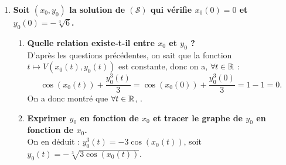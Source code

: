 \documentclass[a4paper, 11pt,reqno]{article}
\begin{document}
\begin{correction}
\begin{enumerate}
\begin{enumerate}
Cette fonction est de classe $\mathcal{C}^1$ sur $\R^2$ comme somme de fonctions $\mathcal{C}^1$. De plus, on a :
$$y^2 \frac{\partial V}{\partial x} (x,y) + \sin(x) \frac{\partial V}{\partial y} (x,y) = -y^2 \sin (x) + \sin(x) y^2 = 0.$$
La fonction v\?erifie bien la condition pr\'ec\'edente. 
\end{enumerate}
\item \textbf{Soit $(x_0,y_0)$ la solution de  $(\mathcal{S})$ qui v\'erifie $x_0(0) = 0$ et $y_0(0) = -\sqrt[3]{6}$.}
\begin{enumerate}
\item \textbf{Quelle relation existe-t-il entre $x_0$ et $y_0$ ?}\\
D'apr\`es les questions pr\'ec\'edentes, on sait que la fonction $t\mapsto V(x_0(t),y_0(t))$ est constante, donc on a, $\forall t \in \mathbb{R}$ :
$$\cos (x_0(t)) + \frac{y_0^3(t)}{3} = \cos (x_0(0)) + \frac{y_0^3(0)}{3} = 1 - 1 = 0.$$
On a donc montr\'e que $\forall t \in \mathbb{R}$, .
\item \textbf{Exprimer $y_0$ en fonction de $x_0$ et tracer le graphe de $y_0$ en fonction de $x_0$.}\\
On en d\'eduit : $y_0^3(t) = - 3 \cos(x_0(t))$, soit $y_0(t) = - \sqrt[3]{3 \cos(x_0(t))}$. 

\end{enumerate}
\end{enumerate}
\end{correction}
\end{document}
